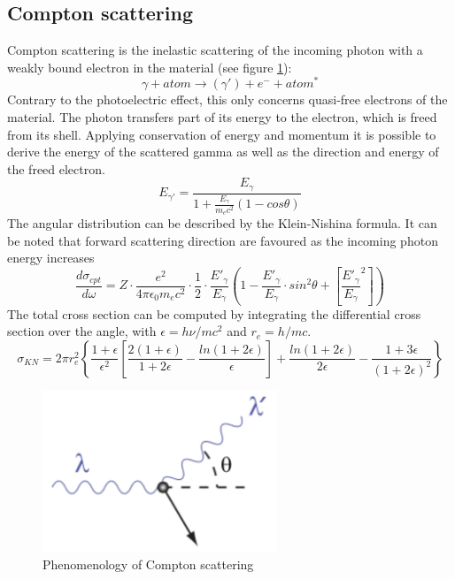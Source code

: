 \subsection{Compton scattering}
Compton scattering is the inelastic scattering of the incoming photon with a weakly bound electron in the material (see figure \ref{fig:compton}):
\begin{equation}
\gamma + atom \rightarrow (\gamma ') + e^{-} + atom^{*}
\end{equation}
Contrary to the photoelectric effect, this only concerns quasi-free electrons of the material. 
The photon transfers part of its energy to the electron, which is freed from its shell.
Applying conservation of energy and momentum it is possible to derive the energy of the scattered gamma as well as the direction and energy of the freed electron.
\begin{equation}
E_{\gamma '} = \frac{E_{\gamma}}{1+\frac{E_{\gamma}}{m_{e}c^{2}}(1-cos\theta)}
\end{equation}
The angular distribution can be described by the Klein-Nishina formula. It can be noted that forward scattering direction are favoured as the incoming photon energy increases
\begin{equation}
\frac{d\sigma _{cpt}}{d\omega} = Z \cdot \frac{e^{2}}{4\pi \epsilon _{0} m_{e} c^{2}} \cdot \frac{1}{2} \cdot \frac{E'_{\gamma}}{E_{\gamma}} \left( 1 - \frac{E'_{\gamma}}{E_{\gamma}} \cdot sin^{2}\theta + \left[ \frac{E'_{\gamma}}{E_{\gamma}} ^{2} \right] \right)
\end{equation}
The total cross section can be computed by integrating the differential cross section over the angle, with $\epsilon = h\nu / mc^{2}$ and $r_{e} = h/mc$.
\begin{equation}
\sigma _{KN} = 2\pi r_{e}^{2} \left \{ \frac{1+\epsilon}{\epsilon ^{2}} \left[ \frac{2(1+\epsilon)}{1 + 2\epsilon} - \frac{ln(1+2\epsilon)}{\epsilon}\right] + \frac{ln(1+2\epsilon)}{2\epsilon}-\frac{1+3\epsilon}{(1+2\epsilon)^{2}}\right \}
\end{equation}
\begin{figure}[htbp]
\centering
\includegraphics[width=7cm]{../Pictures/Chapter_2/259px-Compton-scattering.pdf}
\caption[Compton scattering]{Phenomenology of Compton scattering}
\label{fig:compton}
\end{figure}

